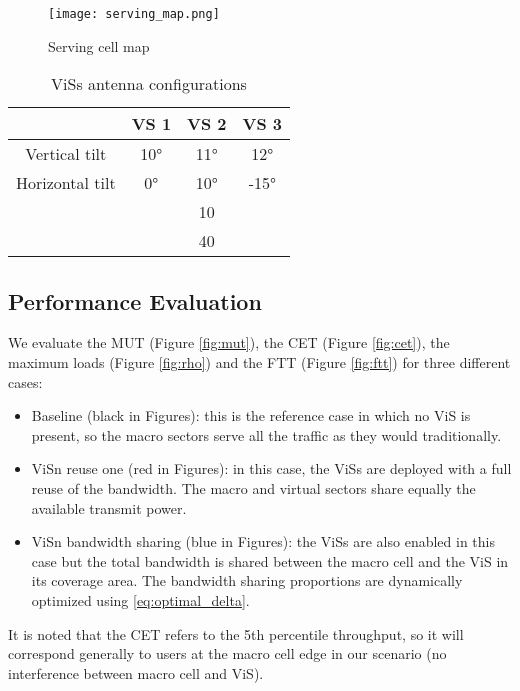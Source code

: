 \documentclass[conference]{IEEEtran}
\begin{document}
\begin{figure}[!ht]
\centering
\texttt{[image: serving\_map.png]}
\caption{Serving cell map}
\label{fig:serving_map}
\end{figure}

\begin{table}[!t]
\small
\renewcommand{\arraystretch}{1.3}
\caption{\ac{ViS}s antenna configurations}
\label{tab:antennas}
\centering
\begin{tabular}{|c|c|c|c|}
    \cline{2-4}
    \multicolumn{1}{c|}{} & VS 1 & VS 2 & VS 3 \\ \hline
    Vertical tilt & 10°  & 11° & 12°  \\ \hline
    Horizontal tilt & 0° & 10° & -15°  \\ \hline
     & \multicolumn{3}{|c|}{10}  \\ \hline
     & \multicolumn{3}{|c|}{40} \\ \hline
\end{tabular}
\end{table}

\subsection{Performance Evaluation}

	We evaluate the \ac{MUT} (Figure \ref{fig:mut}), the \ac{CET} (Figure \ref{fig:cet}), the maximum loads (Figure \ref{fig:rho}) and the \ac{FTT} (Figure \ref{fig:ftt})  for three different cases:
	\begin{itemize}
	\item Baseline (black in Figures): this is the reference case in which no \ac{ViS} is present, so the macro sectors serve all the traffic as they would traditionally.
	\item \ac{ViSn} reuse one (red in Figures): in this case, the \acp{ViS} are deployed with a full reuse of the bandwidth. The macro and virtual sectors share equally the available transmit power.
	\item \ac{ViSn} bandwidth sharing (blue in Figures): the \acp{ViS} are also enabled in this case but the total bandwidth is shared between the macro cell and the \ac{ViS} in its coverage area. The bandwidth sharing proportions are dynamically optimized using \eqref{eq:optimal_delta}.
	\end{itemize}
	It is noted that the \ac{CET} refers to the 5th percentile throughput, so it will correspond generally to users at the macro cell edge in our scenario (no interference between macro cell and \ac{ViS}).
\end{document}
